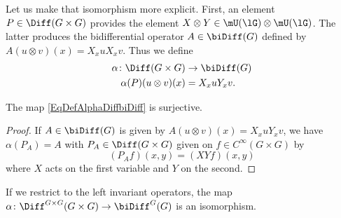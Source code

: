 Let us make that isomorphism more explicit. First, an element $P\in\Diff(G\times G)$ provides the element $X\otimes Y\in\mU(\lG)\otimes\mU(\lG)$. The latter produces the bidifferential operator $A\in\biDiff(G)$ defined by $A(u\otimes v)(x)=X_xuX_xv$. Thus we define
\begin{equation}		\label{EqDefAlphaDiffbiDiff}
	\begin{aligned}
		\alpha\colon \Diff(G\times G) & \to \biDiff(G) \\
		\alpha(P)(u\otimes v)(x)      & =X_xuY_xv.
	\end{aligned}
\end{equation}

\begin{lemma}
	The map \eqref{EqDefAlphaDiffbiDiff} is surjective.
\end{lemma}

\begin{proof}
	If $A\in\biDiff(G)$ is given by $A(u\otimes v)(x)=X_xuY_xv$, we have $\alpha(P_A)=A$ with $P_A\in\Diff(G\times G)$ given on $f\in C^{\infty}(G\times G)$ by
	\begin{equation}
		(P_Af)(x,y)=(XYf)(x,y)
	\end{equation}
	where $X$ acts on the first variable and $Y$ on the second.
\end{proof}

\begin{proposition}
	If we restrict to the left invariant operators, the map $\alpha\colon \Diff^{G\times G}(G\times G)\to \biDiff^G(G)$ is an isomorphism.
\end{proposition}


